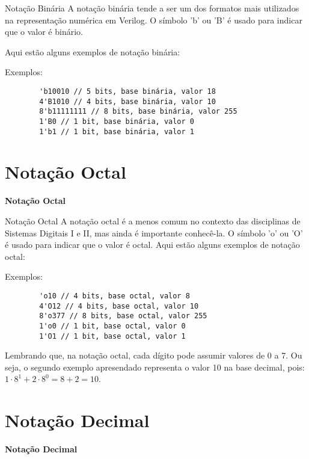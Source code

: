 \documentclass[aspectratio=169,xcolor=dvipsnames]{beamer}
\begin{document}
\begin{frame}[fragile]{Notação Binária}
A notação binária tende a ser um dos formatos mais utilizados na representação numérica em Verilog. O símbolo 'b' ou 'B' é usado para indicar que o valor é binário.

Aqui estão alguns exemplos de notação binária:
    \begin{block}{Exemplos:}
        \begin{verbatim}
        'b10010 // 5 bits, base binária, valor 18
        4'B1010 // 4 bits, base binária, valor 10
        8'b11111111 // 8 bits, base binária, valor 255
        1'B0 // 1 bit, base binária, valor 0
        1'b1 // 1 bit, base binária, valor 1
        \end{verbatim}
    \end{block}
\end{frame}

\section{Notação Octal}
\begin{frame}
    \Huge{\centerline{\textbf{Notação Octal}}}
\end{frame}

\begin{frame}[fragile]{Notação Octal}
A notação octal é a menos comum no contexto das disciplinas de Sistemas Digitais I e II, mas ainda é importante conhecê-la. O símbolo 'o' ou 'O' é usado para indicar que o valor é octal. Aqui estão alguns exemplos de notação octal:
    \begin{block}{Exemplos:}
        \begin{verbatim}
        'o10 // 4 bits, base octal, valor 8
        4'O12 // 4 bits, base octal, valor 10
        8'o377 // 8 bits, base octal, valor 255
        1'o0 // 1 bit, base octal, valor 0
        1'O1 // 1 bit, base octal, valor 1
        \end{verbatim}
    \end{block}
Lembrando que, na notação octal, cada dígito pode assumir valores de 0 a 7. Ou seja, o segundo exemplo apresendado representa o valor 10 na base decimal, pois: $1\cdot8^1 + 2\cdot8^0 = 8 + 2 = 10$.
\end{frame}

\section{Notação Decimal}
\begin{frame}
    \Huge{\centerline{\textbf{Notação Decimal}}}
\end{frame}
\end{document}
